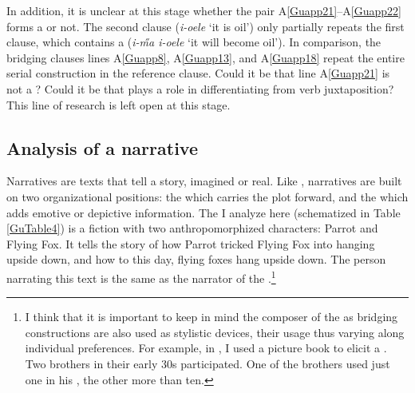 \documentclass[output=paper]{LSP/langsci}
\begin{document}
In addition, it is unclear at this stage whether the pair A\ref{Guapp21}--A\ref{Guapp22} forms a  or not.  The second clause (\textit{i-oele} `it is oil') only partially repeats the first clause, which contains a  (\textit{i-\H{m}a i-oele} `it will become oil'). In comparison, the bridging clauses lines A\ref{Guapp8}, A\ref{Guapp13}, and A\ref{Guapp18} repeat the entire serial construction in the reference clause. Could it be that line A\ref{Guapp21} is not a ? Could it be that  plays a role in differentiating  from verb juxtaposition? This line of research is left open at this stage.

\subsection{Analysis of a narrative}
\label{Gunarrative}
Narratives are texts that tell a story, imagined or real. Like , narratives are built on two organizational positions: the  which carries the plot forward, and the  which adds emotive or depictive information. The  I analyze here (schematized in Table \ref{GuTable4}) is a fiction  with two anthropomorphized characters: Parrot and Flying Fox. It tells the story of how Parrot tricked Flying Fox into hanging upside down, and how to this day, flying foxes hang upside down. The person narrating this text is the same as the narrator of the .\footnote{I think that it is important to keep in mind the composer of the  \citep[][17]{longacre83} as bridging constructions are also used as stylistic devices, their usage thus varying along individual preferences. For example, in , I used a picture book to elicit a . Two brothers in their early 30s participated. One of the brothers used just one  in his , the other more than ten.}
\end{document}

